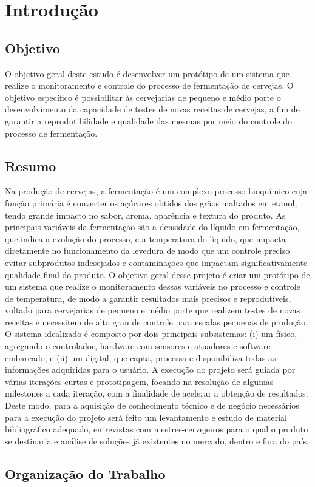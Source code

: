 \chapter{Introdução}

\section{Objetivo}

O objetivo geral deste estudo é desenvolver um protótipo de um sistema que realize o monitoramento e controle do processo de fermentação de cervejas.
O objetivo específico é possibilitar às cervejarias de pequeno e médio porte o desenvolvimento da capacidade de testes de novas receitas de cervejas, 
a fim de garantir a reprodutibilidade e qualidade das mesmas por meio do controle do processo de fermentação.

\section{Resumo}
Na produção de cervejas, a fermentação é um complexo processo bioquímico cuja função primária é converter os açúcares obtidos dos grãos maltados em etanol, tendo grande impacto no sabor, aroma, aparência e textura do produto. 
As principais variáveis da fermentação são a densidade do líquido em fermentação, que indica a evolução do processo, e a temperatura do líquido, que impacta diretamente no funcionamento da levedura de modo que um controle preciso evitar subprodutos indesejados e contaminações que impactam significativamente qualidade final do produto. 
O objetivo geral desse projeto é criar um protótipo de um sistema que realize o monitoramento dessas variáveis no processo e controle de temperatura, de modo a garantir resultados mais precisos e reprodutíveis, voltado para cervejarias de pequeno e médio porte que realizem testes de novas receitas e necessitem de alto grau de controle para escalas pequenas de produção. 
O sistema idealizado é composto por dois principais subsistemas: (i) um físico, agregando o controlador, hardware com sensores e atuadores e software embarcado; e (ii) um digital, que capta, processa e disponibiliza todas as informações adquiridas para o usuário. A execução do projeto será guiada por várias iterações curtas e prototipagem, focando na resolução de algumas milestones a cada iteração, com a finalidade de acelerar a obtenção de resultados.
Deste modo, para a aquisição de conhecimento técnico e de negócio necessários para a execução do projeto será feito um levantamento e estudo de material bibliográfico adequado, entrevistas com mestres-cervejeiros para o qual o produto se destinaria e análise de soluções já existentes no mercado, dentro e fora do país.

\section{Organização do Trabalho}
